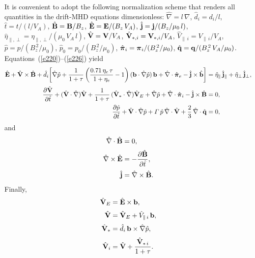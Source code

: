 \documentclass[notitlepage,12pt]{article}
\newcommand{\bpi}{\mbox{\boldmath$\pi$}}
\begin{document}
It is convenient to adopt the following normalization scheme that renders all quantities in the drift-MHD equations dimensionless: 
$\hat{\nabla} = l\,\nabla$, $\hat{d}_i=d_i/l$, $\hat{t} = t/(l/V_A)$, $\hat{\bf B} = {\bf B}/B_z$, $\hat{\bf E} = {\bf E}/(B_z\,V_A)$,
$\hat{\bf j} = {\bf j}/(B_z/\mu_0\,l)$, $\hat{\eta}_{\parallel,\perp} = \eta_{\parallel,\perp}/(\mu_0\,V_A\,l)$, $\hat{\bf V} = {\bf V}/V_A$,
$\hat{{\bf V}}_{\ast,i}= {\bf V}_{\ast,i}/V_A$, $\hat{V}_{\parallel\,i}= V_{\parallel\,i}/V_A$, $\hat{p} = p/(B_z^{\,2}/\mu_0)$, $\hat{p}_0 = p_0/(B_z^{\,2}/\mu_0)$, $\hat{\bpi}_{i} = \bpi_{i}/(B_z^{\,2}/\mu_0)$,
$\hat{\bf q} = {\bf q} /(B_z^{\,2}\,V_A/\mu_0)$. Equations~(\ref{e220})--(\ref{e226}) yield
\begin{align}\label{e227}
\hat{\bf E} + \hat{\bf V}\times \hat{\bf B} + \hat{d}_i\!\left[\hat{\nabla} \hat{p} + \frac{1}{1+\tau}\left(\frac{0.71\,\eta_e\,\tau}{1+\eta_e}-1\right)({\bf b}\cdot\hat{\nabla} \hat{p})\,{\bf b} + \hat{\nabla}\cdot\hat{\bpi}_e-\hat{\bf j}\times\hat{\bf b}\right] &= \hat{\eta}_\parallel\,\hat{\bf j}_\parallel+ \hat{\eta}_\perp\,\hat{\bf j}_\perp,\\[0.5ex]
\frac{\partial \hat{\bf V}}{\partial \hat{t}} 
+ (\hat{\bf V}\cdot\hat{\nabla} )\hat{\bf V} + 
\frac{1}{1+\tau}\,(\hat{\bf V}_\ast\cdot\hat{\nabla})\hat{\bf V}_E
+ \hat{\nabla} \hat{p} + \hat{\nabla}\cdot\hat{\bpi}_i -
 \hat{\bf j}\times \hat{\bf B} &= 0,
 \\[0.5ex]
\frac{\partial \hat{p}}{\partial \hat{t}} + \hat{\bf V}\cdot\hat{\nabla} \hat{p} + {\mit\Gamma}\,\hat{p}\,\hat{\nabla}\cdot\hat{\bf V} + \frac{2}{3}\,\hat{\nabla}\cdot \hat{\bf q}&= 0,\label{e229}
\end{align}
and
\begin{align}
\hat{\nabla}\cdot\hat{\bf B} &= 0,\label{e230}\\[0.5ex]
\hat{\nabla}\times \hat{\bf E} &= - \frac{\partial \hat{\bf B}}{\partial \hat{t}},\label{e231}\\[0.5ex]
\hat{\bf j} &= \hat{\nabla} \times \hat{\bf B}.\label{e232}
\end{align}
Finally,
\begin{align}
\hat{\bf V}_E &= \hat{\bf E}\times {\bf b},\\[0.5ex]
\hat{\bf V} &= \hat{\bf V}_E + \hat{V}_{\parallel\,i}\,{\bf b},\\[0.5ex]
\hat{\bf V}_\ast &= \hat{d}_i\,{\bf b}\times \hat{\nabla} \hat{p},\\[0.5ex]
\hat{\bf V}_i &= \hat{\bf V} + \frac{\hat{\bf V}_{\ast\,i}}{1+\tau}.
\end{align}
\end{document}
